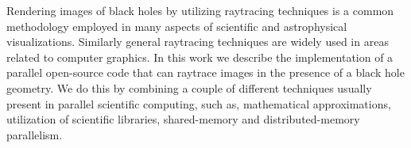 Rendering images of black holes by utilizing raytracing techniques is a common
methodology employed in many aspects of scientific and astrophysical visualizations.
Similarly general raytracing techniques are widely used in areas related to computer graphics.
In this work we describe the implementation of a parallel open-source code that can raytrace images in the presence of a black hole geometry.
We do this by combining a couple of different techniques usually present in parallel scientific computing,
such as, mathematical approximations, utilization of scientific libraries, shared-memory and distributed-memory parallelism.

